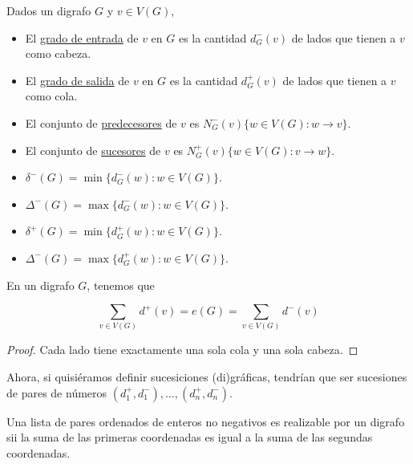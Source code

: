 \begin{defn}
    Dados un digrafo $G$ y $v \in V(G)$,
    
    \begin{itemize}
        \item El \ul{grado de entrada} de $v$ en $G$ es la cantidad $d_G^-(v)$ de lados que tienen a $v$ como cabeza.
        \item El \ul{grado de salida} de $v$ en $G$ es la cantidad $d_G^+(v)$ de lados que tienen a $v$ como cola.
        \item El conjunto de \ul{predecesores} de $v$ es $N_G^-(v) \{w \in V(G) : w \rightarrow v\}$.
        \item El conjunto de \ul{sucesores} de $v$ es $N_G^+(v) \{w \in V(G) : v \rightarrow w\}$.
        \item $\delta^-(G) = \min \{d_G^-(w) : w \in V(G)\}$.
        \item $\Delta^-(G) = \max \{d_G^-(w) : w \in V(G)\}$.
        \item $\delta^+(G) = \min \{d_G^+(w) : w \in V(G)\}$.
        \item $\Delta^-(G) = \max \{d_G^+(w) : w \in V(G)\}$.
    \end{itemize}
\end{defn}

\begin{teo}
    En un digrafo $G$, tenemos que
    
    \[
    \sum_{v \in V(G)} d^+(v) = e(G) = \sum_{v \in V(G)} d^-(v)
    \]
\end{teo}

\begin{proof}
    Cada lado tiene exactamente una sola cola y una sola cabeza.
\end{proof}

Ahora, si quisiéramos definir sucesiciones (di)gráficas, tendrían que ser sucesiones de pares de números $(d_1^+,d_1^-), \dots, (d_n^+,d_n^-)$.

\begin{teo}
    Una lista de pares ordenados de enteros no negativos es realizable por un digrafo sii la suma de las primeras coordenadas es igual a la suma de las segundas coordenadas.
\end{teo}

